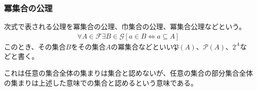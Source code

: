 \documentclass[a4paper]{jsarticle}
\begin{document}
\subsubsection{冪集合の公理}%
\begin{axs}
次式で表される公理を冪集合の公理、巾集合の公理、冪集合公理などという。
\begin{align*}
\forall A\in \mathcal{F\exists}B \in \mathcal{G}[ a \in B \Leftrightarrow a \subseteq A]
\end{align*}
このとき、その集合$B$をその集合$A$の冪集合などといい$\mathfrak{P}(A)$、$\mathcal{P}(A)$、$2^{A}$などと書く。
\end{axs}
これは任意の集合全体の集まりは集合と認めないが、任意の集合の部分集合全体の集まりは上述した意味での集合と認めるという意味である。
\end{document}
